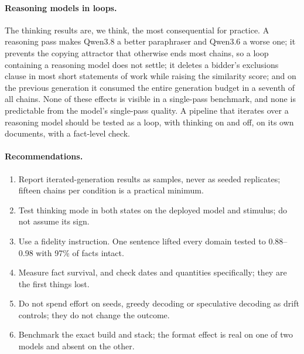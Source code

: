 \documentclass[11pt]{article}
\begin{document}
\paragraph{Reasoning models in loops.}
The thinking results are, we think, the most consequential for practice. A
reasoning pass makes Qwen3.8 a better paraphraser and Qwen3.6 a worse one;
it prevents the copying attractor that otherwise ends most chains, so a
loop containing a reasoning model does not settle; it deletes a bidder's
exclusions clause in most short statements of work while raising the
similarity score; and on the previous generation it consumed the entire
generation budget in a seventh of all chains. None of these effects is
visible in a single-pass benchmark, and none is predictable from the model's
single-pass quality. A pipeline that iterates over a reasoning model should
be tested as a loop, with thinking on and off, on its own documents, with
a fact-level check.

\paragraph{Recommendations.}
\begin{enumerate}[leftmargin=*]
  \item Report iterated-generation results as samples, never as seeded
        replicates; fifteen chains per condition is a practical minimum.
  \item Test thinking mode in both states on the deployed model and
        stimulus; do not assume its sign.
  \item Use a fidelity instruction. One sentence lifted every domain tested
        to 0.88--0.98 with 97\% of facts intact.
  \item Measure fact survival, and check dates and quantities specifically;
        they are the first things lost.
  \item Do not spend effort on seeds, greedy decoding or speculative
        decoding as drift controls; they do not change the outcome.
  \item Benchmark the exact build and stack; the format effect is real on
        one of two models and absent on the other.
\end{enumerate}
\end{document}
